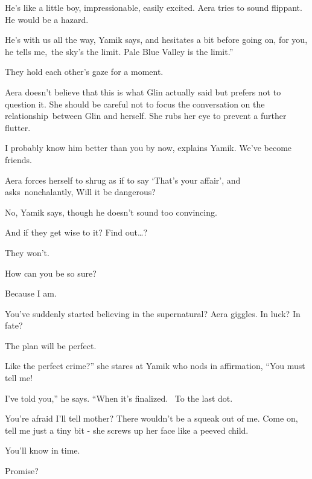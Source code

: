 \documentclass[12pt]{book}
\begin{document}
{\textquotedbl}He's like a little boy, impressionable, easily excited.{\textquotedbl} Aera tries to sound flippant.
{\textquotedbl}He would be a hazard.{\textquotedbl}

{\textquotedbl}He's with us all the way,{\textquotedbl} Yamik says, and hesitates a bit before going on,{
}{\textquotedbl}for you, he tells me,~the sky's the limit. Pale Blue Valley is the limit.''

They hold each other's gaze for a moment.

Aera doesn't believe that this is what Glin actually said but prefers not to question it. She should be careful not to
focus the conversation on the relationship~between Glin and herself. She rubs her eye to prevent a further flutter.

{\textquotedbl}I probably know him better than you by now,{\textquotedbl} explains Yamik. {\textquotedbl}We've become
friends.{\textquotedbl}

Aera forces herself to shrug as if to say `That's your affair', and asks~nonchalantly, {\textquotedbl}Will it be
dangerous?{\textquotedbl}

{\textquotedbl}No,{\textquotedbl} Yamik says, though he doesn't sound too convincing.

{\textquotedbl}And if they get wise{ }to it? Find out{\dots}?{\textquotedbl}

{\textquotedbl}They won't.{\textquotedbl} \

{\textquotedbl}How can you be so sure?{\textquotedbl}

{\textquotedbl}Because I am.{\textquotedbl}

{\textquotedbl}You've suddenly started believing in the supernatural?{\textquotedbl} Aera giggles. {\textquotedbl}In
luck? In fate?{\textquotedbl}

{\textquotedbl}The plan will be perfect.{\textquotedbl}

{\textquotedbl}Like the perfect crime?'' she stares at Yamik who nods in affirmation, ``You must tell me!{\textquotedbl}


{\textquotedbl}I've told you,'' he says. ``When it's finalized.~ To the last dot.{\textquotedbl}

{\textquotedbl}You're afraid I'll tell mother? There wouldn't be a squeak out of me. Come on, tell me just a tiny bit
-{\textquotedbl} she screws up her face like a peeved child.

{\textquotedbl}You'll know in time.{\textquotedbl}

{\textquotedbl}Promise?{\textquotedbl}
\end{document}
